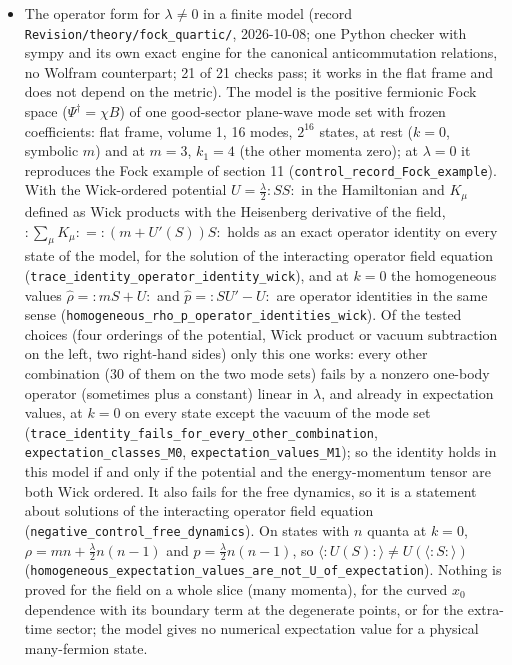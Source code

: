 \documentclass[11pt]{article}
\begin{document}
\begin{itemize}
\item The operator form for $\lambda \neq 0$ in a finite model (record \texttt{Revision\allowbreak{}/theory/\allowbreak{}fock\_qua\allowbreak{}rtic/}, 2026-10-08; one Python checker with sympy and its own exact engine for the canonical anticommutation relations, no Wolfram counterpart; 21 of 21 checks pass; it works in the flat frame and does not depend on the metric). The model is the positive fermionic Fock space ($\Psi^\dagger = \chi B$) of one good-sector plane-wave mode set with frozen coefficients: flat frame, volume 1, 16 modes, $2^{16}$ states, at rest ($k = 0$, symbolic $m$) and at $m = 3$, $k_1 = 4$ (the other momenta zero); at $\lambda = 0$ it reproduces the Fock example of section 11 (\texttt{control\_\allowbreak{}record\_F\allowbreak{}ock\_exam\allowbreak{}ple}). With the Wick-ordered potential $U = \frac{\lambda}{2}{:}SS{:}$ in the Hamiltonian and $K_\mu$ defined as Wick products with the Heisenberg derivative of the field, ${:}\sum_\mu K_\mu{:} = {:}(m + U'(S))S{:}$ holds as an exact operator identity on every state of the model, for the solution of the interacting operator field equation (\texttt{trace\_id\allowbreak{}entity\_o\allowbreak{}perator\_\allowbreak{}identity\allowbreak{}\_wick}), and at $k = 0$ the homogeneous values $\hat\rho = {:}mS + U{:}$ and $\hat p = {:}SU' - U{:}$ are operator identities in the same sense (\texttt{homogene\allowbreak{}ous\_rho\_\allowbreak{}p\_operat\allowbreak{}or\_ident\allowbreak{}ities\_wi\allowbreak{}ck}). Of the tested choices (four orderings of the potential, Wick product or vacuum subtraction on the left, two right-hand sides) only this one works: every other combination (30 of them on the two mode sets) fails by a nonzero one-body operator (sometimes plus a constant) linear in $\lambda$, and already in expectation values, at $k = 0$ on every state except the vacuum of the mode set (\texttt{trace\_id\allowbreak{}entity\_f\allowbreak{}ails\_for\allowbreak{}\_every\_o\allowbreak{}ther\_com\allowbreak{}bination}, \texttt{expectat\allowbreak{}ion\_clas\allowbreak{}ses\_M0}, \texttt{expectat\allowbreak{}ion\_valu\allowbreak{}es\_M1}); so the identity holds in this model if and only if the potential and the energy-momentum tensor are both Wick ordered. It also fails for the free dynamics, so it is a statement about solutions of the interacting operator field equation (\texttt{negative\allowbreak{}\_control\allowbreak{}\_free\_dy\allowbreak{}namics}). On states with $n$ quanta at $k = 0$, $\rho = mn + \frac{\lambda}{2}n(n - 1)$ and $p = \frac{\lambda}{2}n(n - 1)$, so $\langle{:}U(S){:}\rangle \neq U(\langle{:}S{:}\rangle)$ (\texttt{homogene\allowbreak{}ous\_expe\allowbreak{}ctation\_\allowbreak{}values\_a\allowbreak{}re\_not\_U\allowbreak{}\_of\_expe\allowbreak{}ctation}). Nothing is proved for the field on a whole slice (many momenta), for the curved $x_0$ dependence with its boundary term at the degenerate points, or for the extra-time sector; the model gives no numerical expectation value for a physical many-fermion state.

\end{itemize}
\end{document}
